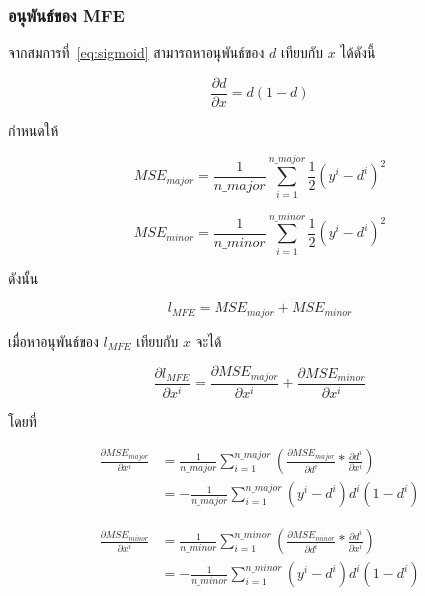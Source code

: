 \subsubsection{อนุพันธ์ของ MFE}
จากสมการที่~\ref{eq:sigmoid} สามารถหาอนุพันธ์ของ $d$ เทียบกับ $x$ ได้ดังนี้

\begin{equation}
\frac{\partial d}{\partial x} = d(1 - d)
\end{equation}

กำหนดให้

\begin{equation}
MSE_{major} = \frac{1}{n\_major}\sum_{i=1}^{n\_major}\frac{1}{2}(y^{i} - d^{i})^{2}
\end{equation}

\begin{equation}
MSE_{minor} = \frac{1}{n\_minor}\sum_{i=1}^{n\_minor}\frac{1}{2}(y^{i} - d^{i})^{2}
\end{equation}

ดังนั้น

\begin{equation}
    l_{MFE} = MSE_{major} + MSE_{minor}
\end{equation}

เมื่อหาอนุพันธ์ของ $l_{MFE}$ เทียบกับ $x$ จะได้

\begin{equation}
\frac{\partial l_{MFE}}{\partial x^{i}} = \frac{\partial MSE_{major}}{\partial x^{i}} + \frac{\partial MSE_{minor}}{\partial x^{i}}
\end{equation}

โดยที่

\begin{equation} \label{eq:fpe_derivative}
\begin{split}
\frac{\partial MSE_{major}}{\partial x^{i}} & = \frac{1}{n\_major} \sum_{i=1}^{n\_major} (\frac{\partial MSE_{major}}{\partial d^{i}} * \frac{\partial d^{i}}{\partial x^{i}}) \\
& = - \frac{1}{n\_major} \sum_{i=1}^{n\_major} (y^{i} - d^{i}) d^{i} (1 - d^{i})
\end{split}
\end{equation}

\begin{equation} \label{eq:fne_derivative}
\begin{split}
\frac{\partial MSE_{minor}}{\partial x^{i}} & = \frac{1}{n\_minor} \sum_{i=1}^{n\_minor} (\frac{\partial MSE_{minor}}{\partial d^{i}} * \frac{\partial d^{i}}{\partial x^{i}}) \\
& = - \frac{1}{n\_minor} \sum_{i=1}^{n\_minor} (y^{i} - d^{i}) d^{i} (1 - d^{i})
\end{split}
\end{equation}

